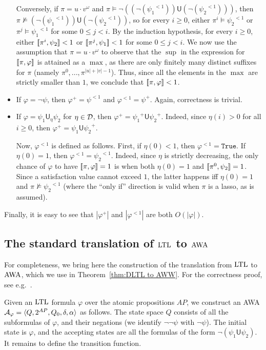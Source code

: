 \documentclass{llncs}
\newcommand{\zug}[1]{\langle #1  \rangle}
\newcommand{\True}{\mathtt{True}}
\newcommand{\LTL}{{\ensuremath{\rm LTL}}\xspace}
\newcommand{\Until}{\mathsf{U}}
\newcommand{\AWW}{\mbox{\rm AWA}\xspace}
\newcommand{\D}{{\cal D}}
\newcommand{\A}{{\cal A}}
\renewcommand{\phi}{\varphi}
\newcommand{\df}{\eta}
\newcommand{\pos}[1]{{#1}^{+}}
\newcommand{\notone}[1]{{#1}^{<1}}
\begin{document}
\begin{itemize}
Conversely, if $\pi=u\cdot v^\omega$ and $\pi\models \neg((\neg (\notone{\psi_1}))\Until (\neg (\notone{\psi_2})))$, then $\pi\not \models (\neg (\notone{\psi_1}))\Until (\neg (\notone{\psi_2}))$, so for every $i\ge 0$, either $\pi^i\models \notone{\psi_2}$ or $\pi^j\models \notone{\psi_1}$ for some $0\le j< i$. By the induction hypothesis, for every $i\ge 0$, either $[\![\pi^i,\psi_2]\!]<1$ or $[\![\pi^j,\psi_1]\!]<1$ for some $0\le j< i$. We now use the assumption that $\pi=u\cdot v^\omega$ to observe that the $\sup$ in the expression for $\sem{\pi,\phi}$ is attained as a $\max$, as there are only finitely many distinct suffixes for $\pi$ (namely $\pi^0,...,\pi^{|u|+|v|-1}$). Thus, since all the elements in the $\max$ are strictly smaller than $1$, we conclude that $\sem{\pi,\phi}<1$.


\item  If $\phi=\neg \psi$, then $\pos{\phi}=\notone{\psi}$ and $\notone{\phi}=\pos{\psi}$. Again, correctness is trivial.

\item
If $\phi=\psi_1\Until_\df \psi_2$ for $\df \in \D$, then
$\pos{\phi}=\pos{\psi_1}\Until \pos{\psi_2}$. Indeed, since $\df(i) > 0$ for all $i \geq 0$, then 
$\pos{\phi}=\pos{\psi_1\Until \psi_2}$.

Now, $\notone{\phi}$ is defined as follows. First, if $\df(0)<1$, then $\notone{\phi}=\True$. If $\df(0)=1$, then $\notone{\phi}=\notone{\psi_2}$. Indeed, since $\df$ is strictly decreasing, the only chance of $\phi$ to have $\sem{\pi,\phi}=1$ is when both $\df(0)=1$ and $[\![\pi^0,\psi_2]\!]=1$. Since a satisfaction value cannot exceed $1$, the latter happens iff $\df(0)=1$ and $\pi\not\models \notone{\psi_2}$ (where the ``only if'' direction is valid when $\pi$ is a lasso, as is assumed). 

\end{itemize}

Finally, it is easy to see that $|\pos{\phi}|$ and $|\notone{\phi}|$ are both $O(|\phi|)$.


\subsection{The standard translation of $\LTL$ to $\AWW$}
\label{apx: standard LTL to AWW}
For completeness, we bring here the construction of the translation from $\LTL$ to $\AWW$, which we use in Theorem~\ref{thm:DLTL to AWW}. For the correctness proof, see e.g.~\cite{Var96}.

Given an \LTL formula $\phi$ over the atomic propositions $AP$, we construct an \AWW $\A_\phi=\zug{Q,2^{AP},Q_0,\delta,\alpha}$ as follows. The state space $Q$ consists of all the subformulas of $\phi$, and their negations (we identify $\neg\neg \psi$ with $\neg \psi$). The initial state is $\phi$, and the accepting states are all the formulas of the form $\neg(\psi_1\Until\psi_2)$. It remains to define the transition function.
\end{document}
